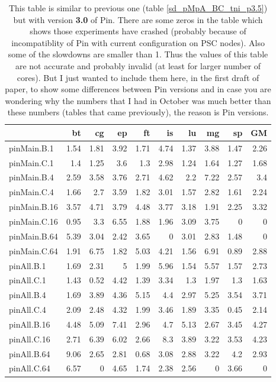 \begin{table*}[]
\caption{This table is similar to previous one (table \ref{sd_pMpA_BC_tni_p3.5}) but with version \textbf{3.0} of Pin. There are some zeros in the table which shows those experiments have crashed (probably because of incompatiblity of Pin with current configuration on PSC nodes). Also some of the slowdowns are smaller than 1. Thus the values of this table are not accurate and probably invalid (at least for larger number of cores). But I just wanted to include them here, in the first draft of paper, to show some differences between Pin versions and in case you are wondering why the numbers that I had in October was much better than these numbers (tables that came previously), the reason is Pin versions.}
 \label{sd_pMpA_BC_tni_p3.0}
\begin{center}
\begin{tabular}{|l|rrrrrrrr|r|}
\hline
              &   bt &   cg &   ep &   ft &   is &   lu &   mg &   sp &   GM \\
\hline
 pinMain.B.1  & 1.54 & 1.81 & 3.92 & 1.71 & 4.74 & 1.37 & 3.88 & 1.47 & 2.26 \\
 pinMain.C.1  &  1.4 & 1.25 &  3.6 &  1.3 & 2.98 & 1.24 & 1.64 & 1.27 & 1.68 \\
 \hline
 pinMain.B.4  & 2.59 & 3.58 & 3.76 & 2.71 & 4.62 &  2.2 & 7.22 & 2.57 &  3.4 \\
 pinMain.C.4  & 1.66 &  2.7 & 3.59 & 1.82 & 3.01 & 1.57 & 2.82 & 1.61 & 2.24 \\
 \hline
 pinMain.B.16 & 3.57 & 4.71 & 3.79 & 4.48 & 3.77 & 3.18 & 1.91 & 2.25 & 3.32 \\
 pinMain.C.16 & 0.95 &  3.3 & 6.55 & 1.88 & 1.96 & 3.09 & 3.75 &    0 &    0 \\
 \hline
 pinMain.B.64 & 5.39 & 3.04 & 2.42 & 3.65 &    0 & 3.01 & 2.83 & 1.48 &    0 \\
 pinMain.C.64 & 1.91 & 6.75 & 1.82 & 5.03 & 4.21 & 1.56 & 6.91 & 0.89 & 2.88 \\
 \hline
 pinAll.B.1   & 1.69 & 2.31 &    5 & 1.99 & 5.96 & 1.54 & 5.57 & 1.57 & 2.73 \\
 pinAll.C.1   & 1.43 & 0.52 & 4.42 & 1.39 & 3.34 &  1.3 & 1.97 &  1.3 & 1.63 \\
 \hline
 pinAll.B.4   & 1.69 & 3.89 & 4.36 & 5.15 &  4.4 & 2.97 & 5.25 & 3.54 & 3.71 \\
 pinAll.C.4   & 2.09 & 2.48 & 4.32 & 1.99 & 3.46 & 1.89 & 3.35 & 0.45 & 2.14 \\
 \hline
 pinAll.B.16  & 4.48 & 5.09 & 7.41 & 2.96 &  4.7 & 5.13 & 2.67 & 3.45 & 4.27 \\
 pinAll.C.16  & 2.71 & 6.39 & 6.02 & 2.66 &  8.3 & 3.89 & 3.22 & 3.53 & 4.23 \\
 \hline
 pinAll.B.64  & 9.06 & 2.65 & 2.81 & 0.68 & 3.08 & 2.88 & 3.22 &  4.2 & 2.93 \\
 pinAll.C.64  & 6.57 &    0 & 4.65 & 1.74 & 2.38 & 2.56 &    0 & 3.66 &    0 \\
 \hline
\end{tabular}
\end{center}
\end{table*}
